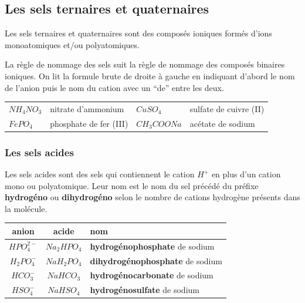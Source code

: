 \documentclass[
  11pt,
  a4paper,
  openany]{book}
\begin{document}
\subsection{Les sels ternaires et quaternaires}\label{les-sels-ternaires-et-quaternaires}

Les sels ternaires et quaternaires sont des composés ioniques formés d'ions monoatomiques et/ou polyatomiques.

La règle de nommage des sels suit la règle de nommage des composés binaires ioniques. On lit la formule brute de droite à gauche en indiquant d'abord le nom de l'anion puis le nom du cation avec un ``de'' entre les deux.

\begin{longtable}[]{@{}
  >{\centering\arraybackslash}p{}
  >{\raggedright\arraybackslash}p{}
  >{\centering\arraybackslash}p{}
  >{\raggedright\arraybackslash}p{}@{}}
\toprule\noalign{}
\endhead
\bottomrule\noalign{}
\endlastfoot
\(NH_4NO_3\) & nitrate d'ammonium & \(CuSO_4\) & sulfate de cuivre (II) \\
\(FePO_4\) & phosphate de fer (III) & \(CH_3COONa\) & acétate de sodium \\
\end{longtable}

\subsubsection{Les sels acides}\label{les-sels-acides}

Les sels acides sont des sels qui contiennent le cation \(H^+\) en plus d'un cation mono ou polyatomique. Leur nom est le nom du sel précédé du préfixe \textbf{hydrogéno} ou \textbf{dihydrogéno} selon le nombre de cations hydrogène présents dans la molécule.

\begin{longtable}[]{@{}ccl@{}}
\toprule\noalign{}
anion & acide & nom \\
\midrule\noalign{}
\endhead
\bottomrule\noalign{}
\endlastfoot
\(HPO_4^{2-}\) & \(Na_2HPO_4\) & \textbf{hydrogénophosphate} de sodium \\
\(H_2PO_4^-\) & \(NaH_2PO_4\) & \textbf{dihydrogénophosphate} de sodium \\
\(HCO_3^-\) & \(NaHCO_3\) & \textbf{hydrogénocarbonate} de sodium \\
\(HSO_4^-\) & \(NaHSO_4\) & \textbf{hydrogénosulfate} de sodium \\
\end{longtable}
\end{document}
